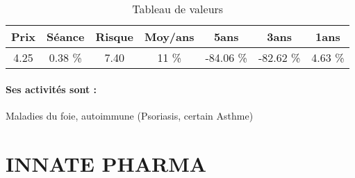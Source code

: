 \documentclass[11pt,a4paper]{report}%
\begin{document}
\begin{table}[H]
  \centering
    \begin{tabular}{|c|c|c|c|c|c|c|}
    \hline
    Prix & Séance & Risque  & Moy/ans & 5ans & 3ans & 1ans \\
    \hline
    4.25 &    0.38 \%    & 7.40 & 11 \% & -84.06 \% & -82.62 \% & 4.63 \% \\
    \hline
    \end{tabular}%
        \label{tab:table_GENFIT}%
      \caption{Tableau de valeurs}
\end{table}%

\paragraph{Ses activités sont : } Maladies du foie, autoimmune (Psoriasis, certain Asthme) 
    
    \newpage

\section{INNATE PHARMA}
\end{document}
